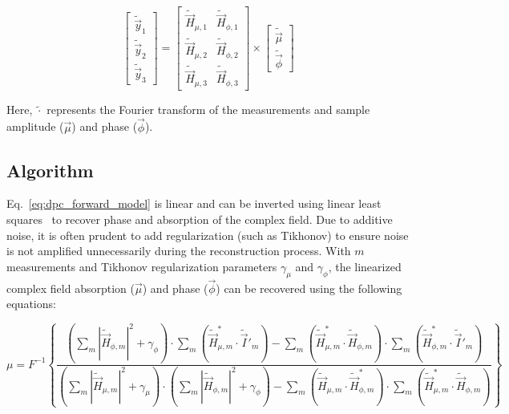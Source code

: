 \begin{equation}
    \label{eq:dpc_forward_model}
    \begin{bmatrix}\tilde{\vec{y}}_1 \\ \tilde{\vec{y}}_2 \\ \tilde{\vec{y}}_3\end{bmatrix} = \begin{bmatrix}\tilde{\vec{H}}_{\mu, 1} & \tilde{\vec{H}}_{\phi, 1}\\ \tilde{\vec{H}}_{\mu, 2} & \tilde{\vec{H}}_{\phi, 2} \\ \tilde{\vec{H}}_{\mu, 3} & \tilde{\vec{H}}_{\phi, 3}\end{bmatrix} \times \begin{bmatrix}\tilde{\vec{\mu}} \\ \tilde{\vec{\phi}}\end{bmatrix}
\end{equation}

\noindent Here, $\tilde{\cdot}$ represents the Fourier transform of the measurements and sample amplitude ($\vec{\mu}$) and phase ($\vec{\phi}$).

\subsection{Algorithm}
Eq.~\ref{eq:dpc_forward_model} is linear and can be inverted using linear least squares~\cite{tian2015quantitative} to recover phase and absorption of the complex field. Due to additive noise, it is often prudent to add regularization (such as Tikhonov) to ensure noise is not amplified unnecessarily during the reconstruction process. With $m$ measurements and Tikhonov regularization parameters $\gamma_{\mu}$ and $\gamma_{\phi}$, the linearized complex field absorption ($\vec{\mu}$) and phase ($\vec{\phi}$) can be recovered using the following equations:

\begin{equation} \label{eq:Ha_inverse}
\mu = F^{-1}\left\{\frac{\left(\sum\limits_{m}|\tilde{\vec{H}}_{\phi,m}|^2+\gamma_{\phi}\right)\cdot\sum\limits_{m}\left(\tilde{\vec{H}}^*_{\mu,m}\cdot\tilde{\vec{I}}'_{m}\right)-\sum\limits_{m} \left ( \tilde{\vec{H}}^*_{\mu,m}\cdot\tilde{\vec{H}}_{\phi,m} \right ) \cdot\sum\limits_{m}\left(\tilde{\vec{H}}^*_{\phi,m}\cdot\tilde{\vec{I}}'_{m}\right)}{\left(\sum\limits_{m}|\tilde{\vec{H}}_{\mu,m}|^2+\gamma_{\mu}\right)\cdot\left(\sum\limits_{m}|\tilde{\vec{H}}_{\phi,m}|^2+\gamma_{\phi}\right) - \sum\limits_{m}\left(\tilde{\vec{H}}_{\mu,m}\cdot\tilde{\vec{H}}^*_{\phi,m}\right)\cdot\sum\limits_{m}\left(\tilde{\vec{H}}^*_{\mu,m}\cdot\tilde{\vec{H}}_{\phi,m}\right)} \right\}
\end{equation}

